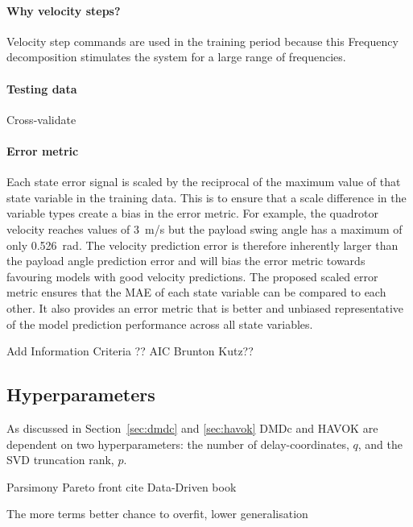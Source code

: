         \paragraph{Why velocity steps?}
        Velocity step commands are used in the training period because this 
        Frequency decomposition stimulates the system for a large range of frequencies.

        \paragraph{Testing data}
        Cross-validate

        \paragraph{Error metric}
        Each state error signal is scaled by the reciprocal of the maximum value of that state variable in the training data.
        This is to ensure that a scale difference in the variable types create a bias in the error metric.
        For example, the quadrotor velocity reaches values of \SI{3}{\metre/\second} but the payload swing angle has a maximum of only \SI[]{0.526}{\radian}.
        The velocity prediction error is therefore inherently larger than the payload angle prediction error
        and will bias the error metric towards favouring models with good velocity predictions.
        The proposed scaled error metric ensures that the MAE of each state variable can be compared to each other.
        It also provides an error metric that is better and unbiased representative of the model prediction performance across all state variables. 

        Add Information Criteria ??
        AIC Brunton Kutz??

    \subsection{Hyperparameters}
        As discussed in Section~\ref{sec:dmdc} and \ref{sec:havok} 
        DMDc and HAVOK are dependent on two hyperparameters: the number of delay-coordinates, $q$, and the SVD truncation rank, $p$.

        Parsimony
        Pareto front
        cite Data-Driven book

        The more terms better chance to overfit, lower generalisation
        

